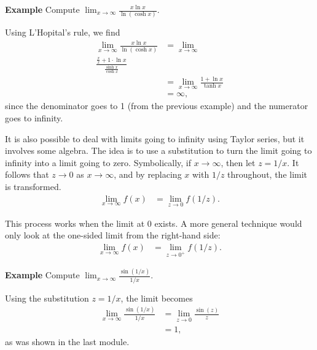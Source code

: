 \documentclass[twoside,openright,titlepage,a4paper]{book}
\begin{document}
\begin{sloppypar}
\textbf{Example} Compute $ \displaystyle \lim_{x \rightarrow \infty} \frac{x \ln x}{\ln(\cosh x)}$. 
\begin{examplebox}
Using L'Hopital's rule, we find
\begin{align*}
\lim_{x \rightarrow \infty} \frac{ x \ln x}{\ln (\cosh x) } &= \lim_{x \rightarrow \infty} \\ \frac{\frac{x}{x} + 1 \cdot \ln x}{\frac{\sinh x}{\cosh x}} \\
&= \lim_{x \rightarrow \infty} \frac{1+ \ln x}{\tanh x} \\
&= \infty,
\end{align*}
since the denominator goes to 1 (from the previous example) and the numerator goes to infinity.
\end{examplebox}

It is also possible to deal with limits going to infinity using Taylor series, but it involves some algebra. The idea is to use a substitution to turn the limit going to infinity into a limit going to zero. Symbolically, if $x \rightarrow \infty$, then let $z = 1/x$. It follows that $z \rightarrow 0$ as $x \rightarrow \infty$, and by replacing $x$ with $1/z$ throughout, the limit is transformed.
\begin{align*}
\lim_{x \rightarrow \infty} f(x) &= \lim_{z \rightarrow 0} f(1/z).
\end{align*}

This process works when the limit at 0 exists. A more general technique would only look at the one-sided limit from the right-hand side:
\begin{align*}
\lim_{x \rightarrow \infty} f(x) &= \lim_{z \rightarrow 0^+} f(1/z).
\end{align*}

\textbf{Example} Compute $\displaystyle \lim_{x \rightarrow \infty} \frac{\sin(1/x)}{1/x}$.
\begin{examplebox}
Using the substitution $z = 1/x$, the limit becomes
\begin{align*}
\lim_{x \rightarrow \infty} \frac{\sin(1/x)}{1/x} &= \lim_{z \rightarrow 0} \frac{\sin(z)}{z} \\
&= 1,
\end{align*}
as was shown in the last module.
\end{examplebox}


\end{sloppypar}
\end{document}
